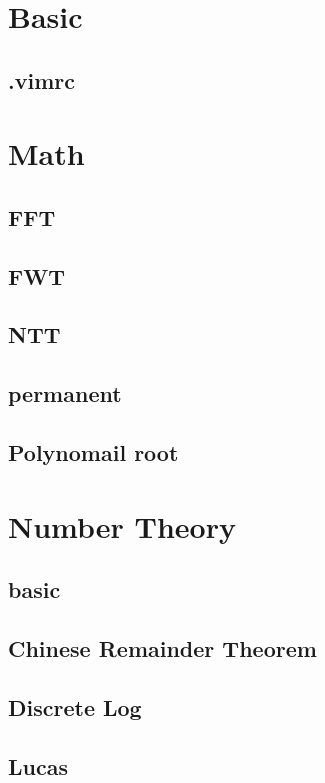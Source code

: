 \section{Basic}
\subsection{.vimrc}


\section{Math}
\subsection{FFT}

\subsection{FWT}

\subsection{NTT}

\subsection{permanent}

\subsection{Polynomail root}


\section{Number Theory}
\subsection{basic}

\subsection{Chinese Remainder Theorem}

\subsection{Discrete Log}

\subsection{Lucas}

